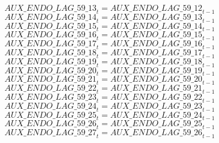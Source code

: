 \begin{dmath}
{AUX\_ENDO\_LAG\_59\_13}_{t}={AUX\_ENDO\_LAG\_59\_12}_{t-1}
\end{dmath}
\begin{dmath}
{AUX\_ENDO\_LAG\_59\_14}_{t}={AUX\_ENDO\_LAG\_59\_13}_{t-1}
\end{dmath}
\begin{dmath}
{AUX\_ENDO\_LAG\_59\_15}_{t}={AUX\_ENDO\_LAG\_59\_14}_{t-1}
\end{dmath}
\begin{dmath}
{AUX\_ENDO\_LAG\_59\_16}_{t}={AUX\_ENDO\_LAG\_59\_15}_{t-1}
\end{dmath}
\begin{dmath}
{AUX\_ENDO\_LAG\_59\_17}_{t}={AUX\_ENDO\_LAG\_59\_16}_{t-1}
\end{dmath}
\begin{dmath}
{AUX\_ENDO\_LAG\_59\_18}_{t}={AUX\_ENDO\_LAG\_59\_17}_{t-1}
\end{dmath}
\begin{dmath}
{AUX\_ENDO\_LAG\_59\_19}_{t}={AUX\_ENDO\_LAG\_59\_18}_{t-1}
\end{dmath}
\begin{dmath}
{AUX\_ENDO\_LAG\_59\_20}_{t}={AUX\_ENDO\_LAG\_59\_19}_{t-1}
\end{dmath}
\begin{dmath}
{AUX\_ENDO\_LAG\_59\_21}_{t}={AUX\_ENDO\_LAG\_59\_20}_{t-1}
\end{dmath}
\begin{dmath}
{AUX\_ENDO\_LAG\_59\_22}_{t}={AUX\_ENDO\_LAG\_59\_21}_{t-1}
\end{dmath}
\begin{dmath}
{AUX\_ENDO\_LAG\_59\_23}_{t}={AUX\_ENDO\_LAG\_59\_22}_{t-1}
\end{dmath}
\begin{dmath}
{AUX\_ENDO\_LAG\_59\_24}_{t}={AUX\_ENDO\_LAG\_59\_23}_{t-1}
\end{dmath}
\begin{dmath}
{AUX\_ENDO\_LAG\_59\_25}_{t}={AUX\_ENDO\_LAG\_59\_24}_{t-1}
\end{dmath}
\begin{dmath}
{AUX\_ENDO\_LAG\_59\_26}_{t}={AUX\_ENDO\_LAG\_59\_25}_{t-1}
\end{dmath}
\begin{dmath}
{AUX\_ENDO\_LAG\_59\_27}_{t}={AUX\_ENDO\_LAG\_59\_26}_{t-1}
\end{dmath}
